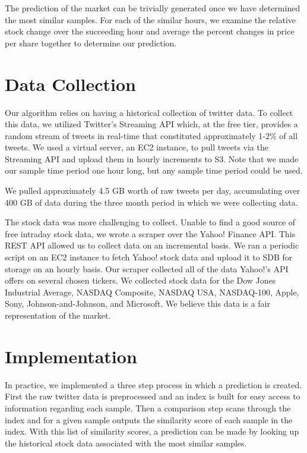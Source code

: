\documentclass[twocolumn]{article}
\begin{document}
The prediction of the market can be trivially generated once we have determined the most similar samples. For each of the similar hours, we examine the relative stock change over the succeeding hour and average the percent changes in price per share together to determine our prediction.

\section{Data Collection}
Our algorithm relies on having a historical collection of twitter data. To collect this data, we utilized Twitter's Streaming API which, at the free tier, provides a random stream of tweets in real-time that constituted approximately 1-2\% of all tweets. We used a virtual server, an EC2 instance, to pull tweets via the Streaming API and upload them in hourly increments to S3. Note that we made our sample time period one hour long, but any sample time period could be used.

We pulled approximately 4.5 GB worth of raw tweets per day, accumulating over 400 GB of data during the three month period in which we were collecting data. 

The stock data was more challenging to collect. Unable to find a good source of free intraday stock data, we wrote a scraper over the Yahoo! Finance API. This REST API allowed us to collect data on an incremental basis. We ran a periodic script on an EC2 instance to fetch Yahoo! stock data and upload it to SDB for storage on an hourly basis. Our scraper collected all of the data Yahoo!'s API offers on several chosen tickers. We collected stock data for the Dow Jones Industrial Average, NASDAQ Composite, NASDAQ USA, NASDAQ-100, Apple, Sony, Johnson-and-Johnson, and Microsoft. We believe this data is a fair representation of the market.

\section{Implementation}
In practice, we implemented a three step process in which a prediction is created. First the raw twitter data is preprocessed and an index is built for easy access to information regarding each sample. Then a comparison step scans through the index and for a given sample outputs the similarity score of each sample in the index. With this list of similarity scores, a prediction can be made by looking up the historical stock data associated with the most similar samples.
\end{document}
